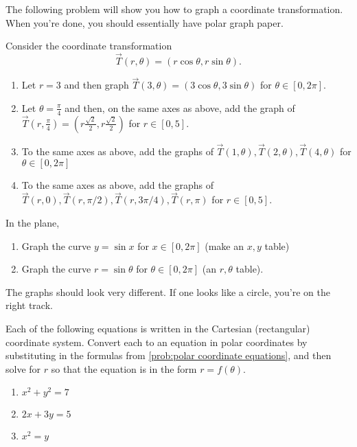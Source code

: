 The following problem will show you how to graph a coordinate transformation.  When you're done, you should essentially have polar graph paper.

\begin{problem} \label{polar coordinate transformation graph}
Consider the coordinate transformation $$\vec T(r,\theta) = (r\cos\theta,r\sin\theta).$$ 
\begin{enumerate}
\item Let $r=3$ and then graph $\vec T(3,\theta)=(3\cos\theta,3\sin\theta)$ for $\theta\in[0,2\pi]$.
\item Let $\theta=\frac{\pi}{4}$ and then, on the same axes as above, add the graph of 
$\vec T\left(r,\frac{\pi}{4}\right)=\left(r\frac{\sqrt 2}{2},r \frac{\sqrt 2}{2}\right)$ for $r\in[0,5]$.
\item To the same axes as above, add the graphs of 
$\vec T(1,\theta), \vec T(2,\theta), \vec T(4,\theta)$  for $\theta\in[0,2\pi]$ 
\item To the same axes as above, add the graphs of $\vec T(r,0), \vec T(r,\pi/2), \vec T(r,3\pi/4), \vec T(r,\pi)$ for $r\in[0,5]$. 
\end{enumerate}
\end{problem}


\begin{problem} 
In the plane, 
\begin{enumerate}
	\item Graph the curve $y=\sin x$ for $x\in[0,2\pi]$ (make an $x,y$ table) 
	\item Graph the curve $r=\sin\theta$ for $\theta\in[0,2\pi]$ (an $r,\theta$ table).
\end{enumerate}
The graphs should look very different.  If one looks like a circle, you're on the right track.  
\end{problem}

\begin{problem}
%
Each of the following equations is written in the Cartesian (rectangular) coordinate system.  Convert each to an equation in polar coordinates by substituting in the formulas from \ref{prob:polar coordinate equations}, and then solve for $r$ so that the equation is in the form $r=f(\theta)$.
\begin{enumerate}
\item $x^2+y^2=7$
\item $2x+3y=5$
\item $x^2=y$
\end{enumerate}
\end{problem}

